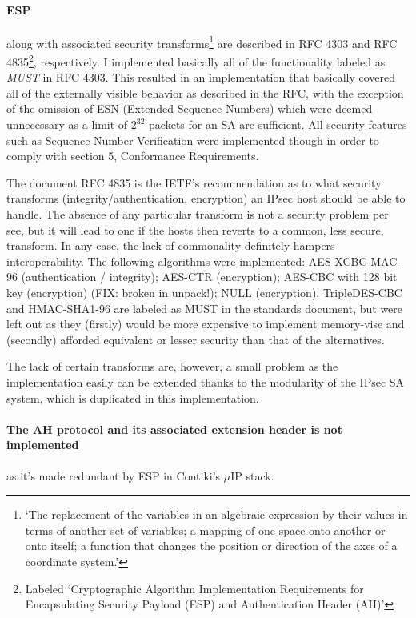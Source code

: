 \documentclass[final,a4paper,twoside,11pt,onecolumn]{report}
\begin{document}
\paragraph{ESP} along with associated security transforms\footnote{`The replacement of the variables in an algebraic expression by their values in terms of another set of variables; a mapping of one space onto another or onto itself; a function that changes the position or direction of the axes of a coordinate system.'\cite{wiki:transforms}} are described in RFC 4303\cite{rfc4303} and RFC 4835\cite{rfc4835}\footnote{Labeled `Cryptographic Algorithm Implementation Requirements for Encapsulating Security Payload (ESP) and Authentication Header (AH)'}, respectively. I implemented basically all of the functionality labeled as \emph{MUST} in RFC 4303. This resulted in an implementation that basically covered all of the externally visible behavior as described in the RFC, with the exception of the omission of ESN (Extended Sequence Numbers) which were deemed unnecessary as a limit of $2^{32}$ packets for an SA are sufficient. All security features such as Sequence Number Verification\citep[3.4.3]{rfc4303} were implemented though in order to comply with section 5, Conformance Requirements\citep[section 5]{rfc4303}.

The document RFC 4835 is the IETF's recommendation as to what security transforms (integrity/authentication, encryption) an IPsec host should be able to handle. The absence of any particular transform is not a security problem per see, but it will lead to one if the hosts then reverts to a common, less secure, transform. In any case, the lack of commonality definitely hampers interoperability. The following algorithms were implemented: AES-XCBC-MAC-96\cite{rfc3566} (authentication / integrity); AES-CTR\cite{rfc3686} (encryption); AES-CBC with 128 bit key\cite{rfc3602} (encryption) (FIX: broken in unpack!); NULL\cite{rfc2410} (encryption). TripleDES-CBC\cite{rfc2451} and HMAC-SHA1-96\cite{rfc2404} are labeled as MUST in the standards document\cite{rfc4835}, but were left out as they (firstly) would be more expensive to implement memory-vise and (secondly) afforded equivalent or lesser security than that of the alternatives.

The lack of certain transforms are, however, a small problem as the implementation easily can be extended thanks to the modularity of the IPsec SA system, which is duplicated in this implementation.

\paragraph{The AH protocol and its associated extension header is not implemented} as it's made redundant by ESP in Contiki's $\mu$IP stack.
\end{document}

